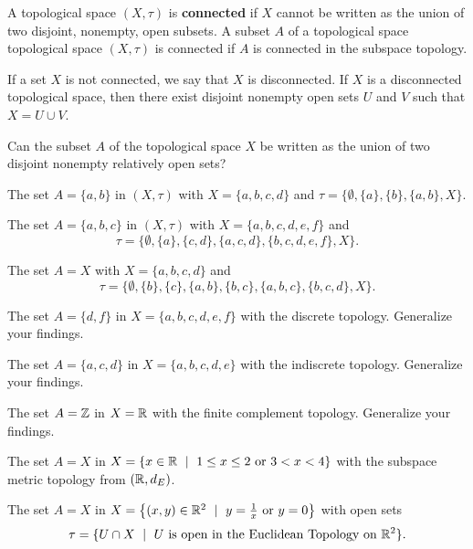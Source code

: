 \begin{definition}  A topological space $(X,\tau)$ is \textbf{connected} if $X$ cannot be written as the union of two disjoint, nonempty, open subsets. A subset $A$ of a topological space topological space $(X,\tau)$ is connected if $A$ is connected in the subspace topology. 
\end{definition}


If a set $X$ is not connected, we say that $X$ is disconnected. If $X$ is a disconnected topological space, then there exist disjoint nonempty open sets $U$ and $V$ such that $X = U \cup V$. %

\begin{pa} Can the subset $A$ of the topological space $X$ be written as the union of two disjoint nonempty relatively open sets?
\be
\item The set $A = \{a, b\}$ in $(X, \tau)$ with $X = \{a, b, c, d\}$ and $\tau = \{\emptyset, \{a\}, \{b\}, \{a, b\}, X\}$.

\item The set $A = \{a, b, c\}$ in $(X, \tau)$ with $X = \{a,b,c,d,e,f\}$ and 
\[\tau = \{\emptyset, \{a\}, \{c,d\}, \{a, c, d\}, \{b,c,d,e,f\}, X\}.\]

\item  The set $A = X$ with $X = \{a,b,c,d\}$ and 
\[\tau = \{\emptyset, \{b\}, \{c\}, \{a,b\}, \{b,c\}, \{a,b,c\}, \{b,c,d\}, X\}.\]

\item The set $A = \{d, f\}$ in $X = \{a, b, c, d, e, f\}$ with the discrete topology. Generalize your findings.

\item The set $A = \{a, c, d\}$ in $X = \{a, b, c, d, e\}$ with the indiscrete topology. Generalize your findings.

\item The set $A = \mathbb{Z}$ in $X = \mathbb{R}$ with the finite complement topology. Generalize your findings.

\item The set $A = X$ in $X = \{x \in \mathbb{R} \ \mid \ 1 \leq x \leq 2 \text{ or }  3 < x < 4\}$ with the subspace metric topology from $(\mathbb{R}, d_E)$.

\item The set $A = X$ in $X = \left\{(x, y) \in \mathbb{R}^2 \ \mid \  y = \frac{1}{x} \text{ or } y = 0\right\}$ with open sets 
\[\tau = \{U  \cap X \ \mid \ U \text{ is open in the Euclidean Topology on } \mathbb{R}^2\}.\]

\ee

\end{pa}

